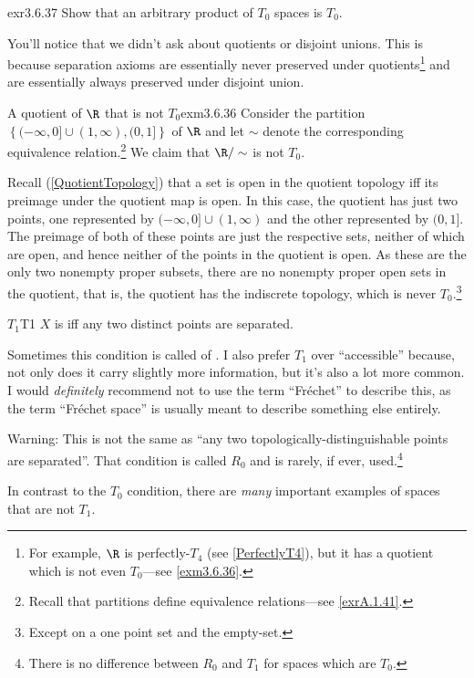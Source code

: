 \begin{exr}{}{exr3.6.37}
Show that an arbitrary product of $T_0$ spaces is $T_0$.
\end{exr}
You'll notice that we didn't ask about quotients or disjoint unions.  This is because separation axioms are essentially never preserved under quotients\footnote{For example, $\R$ is perfectly-$T_4$ (see \cref{PerfectlyT4}), but it has a quotient which is not even $T_0$---see \cref{exm3.6.36}.} and are essentially always preserved under disjoint union.
\begin{exm}{A quotient of $\R$ that is not $T_0$}{exm3.6.36}
Consider the partition $\left\{ (-\infty ,0]\cup (1,\infty ),(0,1]\right\}$ of $\R$ and let $\sim$ denote the corresponding equivalence relation.\footnote{Recall that partitions define equivalence relations---see \cref{exrA.1.41}.}  We claim that $\R /\sim$ is not $T_0$.

Recall (\cref{QuotientTopology}) that a set is open in the quotient topology iff its preimage under the quotient map is open.  In this case, the quotient has just two points, one represented by $(-\infty ,0]\cup (1,\infty )$ and the other represented by $(0,1]$.  The preimage of both of these points are just the respective sets, neither of which are open, and hence neither of the points in the quotient is open.  As these are the only two nonempty proper subsets, there are no nonempty proper open sets in the quotient, that is, the quotient has the indiscrete topology, which is never $T_0$.\footnote{Except on a one point set and the empty-set.}
\end{exm}
\begin{dfn}{$T_1$}{T1}
$X$ is  iff any two distinct points are separated.
\begin{rmk}
Sometimes this condition is called  of .  I also prefer $T_1$ over ``accessible'' because, not only does it carry slightly more information, but it's also a lot more common.  I would \emph{definitely} recommend not to use the term ``Fréchet'' to describe this, as the term ``Fréchet space'' is usually meant to describe something else entirely.
\end{rmk}
\begin{wrn}
Warning:  This is not the same as ``any two topologically-distinguishable points are separated''.  That condition is called $R_0$ and is rarely, if ever, used.\footnote{There is no difference between $R_0$ and $T_1$ for spaces which are $T_0$.}
\end{wrn}
\begin{rmk}
In contrast to the $T_0$ condition, there are \emph{many} important examples of spaces that are not $T_1$.
\end{rmk}
\end{dfn}
